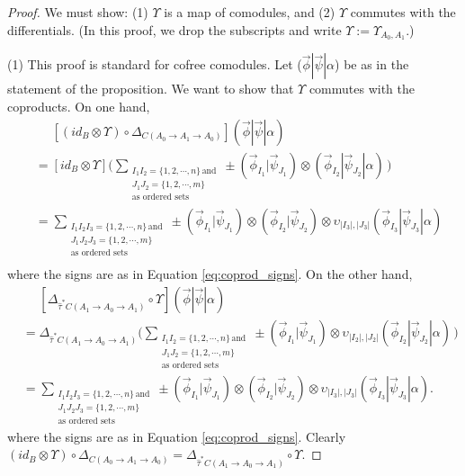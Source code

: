 \begin{proof}
We must show: (1) $\Upsilon$ is a map of comodules, and 
(2) $\Upsilon$ commutes with the differentials. (In this 
proof, we drop the subscripts and write 
$\Upsilon := \Upsilon_{A_0, A_1}$.)

(1) This proof is standard for cofree comodules. 
Let ($\vec{\phi} | \vec{\psi} | \alpha$) be as 
in the statement of the proposition. We want to 
show that $\Upsilon$ commutes with the coproducts. 
On one hand,
\begin{align*}
&\phantom{{}={}}
[(id_B \otimes \Upsilon) \circ 
  \Delta_{C(A_0 \to A_1 \to A_0)}] 
  ( \vec{\phi} | \vec{\psi} | \alpha ) \\
&= [id_B \otimes \Upsilon]
	\big( \sum_{\substack{I_1I_2 = \{1,2,\cdots,n\} \, \textrm{and} \\ 
						  J_1J_2 = \{1,2,\cdots,m\} \\
				          \textrm{as ordered sets}}} 
    \pm (\vec{\phi}_{I_1} | \vec{\psi}_{J_1}) \otimes (\vec{\phi}_{I_2} | \vec{\psi}_{J_2} | \alpha) \, \big) \\
&= \sum_{\substack{I_1I_2I_3 = \{1,2,\cdots,n\} \, \textrm{and} \\ 
				   J_1J_2J_3 = \{1,2,\cdots,m\} \\
				   \textrm{as ordered sets}}} 
    \pm (\vec{\phi}_{I_1} | \vec{\psi}_{J_1}) \otimes 
    (\vec{\phi}_{I_2} | \vec{\psi}_{J_2}) \otimes 
    \upsilon_{|I_3|,|J_3|}(\vec{\phi}_{I_3} | \vec{\psi}_{J_3} | \alpha) \\
\end{align*}
where the signs are as in Equation 
\ref{eq:coprod_signs}. On the other hand,
\begin{align*}
&\phantom{{}={}}
[\Delta_{\hat{\tau}^*C(A_1 \to A_0 \to A_1)} 
  \circ \Upsilon ]
  ( \vec{\phi} | \vec{\psi} | \alpha ) \\
&= \Delta_{\hat{\tau}^*C(A_1 \to A_0 \to A_1)}
	\big( \sum_{\substack{I_1I_2 = \{1,2,\cdots,n\} \, \textrm{and} \\ 
						  J_1J_2 = \{1,2,\cdots,m\} \\
				          \textrm{as ordered sets}}}
	\pm (\vec{\phi}_{I_1} | \vec{\psi}_{J_1}) \otimes 
    \upsilon_{|I_2|,|J_2|}(\vec{\phi}_{I_2} | \vec{\psi}_{J_2} | \alpha) \, \big)\\
&= \sum_{\substack{I_1I_2I_3 = \{1,2,\cdots,n\} \, \textrm{and} \\ 
				   J_1J_2J_3 = \{1,2,\cdots,m\} \\
				   \textrm{as ordered sets}}} 
    \pm (\vec{\phi}_{I_1} | \vec{\psi}_{J_1}) \otimes 
    (\vec{\phi}_{I_2} | \vec{\psi}_{J_2}) \otimes 
    \upsilon_{|I_3|,|J_3|}(\vec{\phi}_{I_3} | \vec{\psi}_{J_3} | \alpha).   				          
\end{align*}
where the signs are as in Equation 
\ref{eq:coprod_signs}. Clearly 
$(id_B \otimes \Upsilon) \circ 
\Delta_{C(A_0 \to A_1 \to A_0)} = 
\Delta_{\hat{\tau}^*C(A_1 \to A_0 \to A_1)} 
\circ \Upsilon$.


\end{proof}
